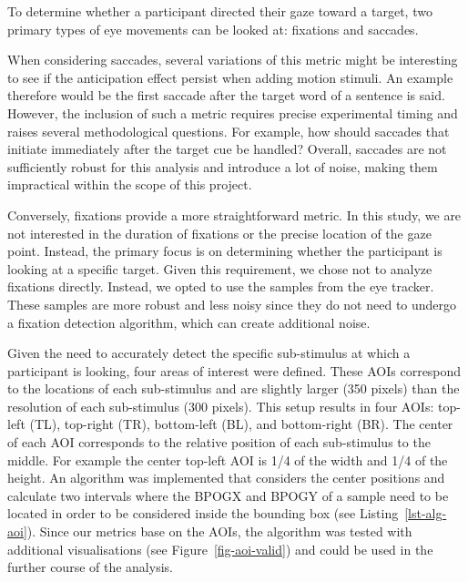 \documentclass[
  12pt,
  letterpaper,
  DIV=11,
  numbers=noendperiod]{scrreprt}
\begin{document}
To determine whether a participant directed their gaze toward a target,
two primary types of eye movements can be looked at: fixations and
saccades.

When considering saccades, several variations of this metric might be
interesting to see if the anticipation effect persist when adding motion
stimuli. An example therefore would be the first saccade after the
target word of a sentence is said. However, the inclusion of such a
metric requires precise experimental timing and raises several
methodological questions. For example, how should saccades that initiate
immediately after the target cue be handled? Overall, saccades are not
sufficiently robust for this analysis and introduce a lot of noise,
making them impractical within the scope of this project.

Conversely, fixations provide a more straightforward metric. In this
study, we are not interested in the duration of fixations or the precise
location of the gaze point. Instead, the primary focus is on determining
whether the participant is looking at a specific target. Given this
requirement, we chose not to analyze fixations directly. Instead, we
opted to use the samples from the eye tracker. These samples are more
robust and less noisy since they do not need to undergo a fixation
detection algorithm, which can create additional noise.

Given the need to accurately detect the specific sub-stimulus at which a
participant is looking, four areas of interest were defined. These AOIs
correspond to the locations of each sub-stimulus and are slightly larger
(350 pixels) than the resolution of each sub-stimulus (300 pixels). This
setup results in four AOIs: top-left (TL), top-right (TR), bottom-left
(BL), and bottom-right (BR). The center of each AOI corresponds to the
relative position of each sub-stimulus to the middle. For example the
center top-left AOI is 1/4 of the width and 1/4 of the height. An
algorithm was implemented that considers the center positions and
calculate two intervals where the BPOGX and BPOGY of a sample need to be
located in order to be considered inside the bounding box (see
Listing~\ref{lst-alg-aoi}). Since our metrics base on the AOIs, the
algorithm was tested with additional visualisations (see
Figure~\ref{fig-aoi-valid}) and could be used in the further course of
the analysis.
\end{document}
